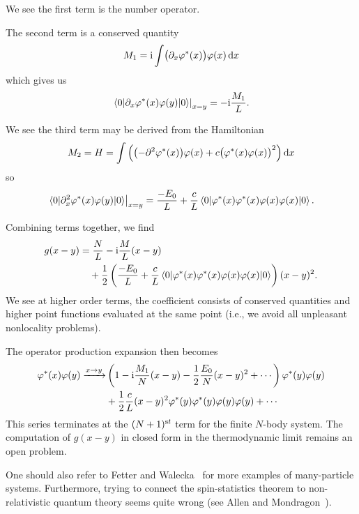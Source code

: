 We see the first term is the number operator. 

The second term is a conserved quantity
\begin{equation}
M_{1} = \mathrm{i}\int\bigl(\partial_{x}\varphi^{*}(x)\bigr)\varphi(x)\,\mathrm{d} x
\end{equation}
which gives us
\begin{equation}
\left.\braket{0|\partial_{x}\varphi^{*}(x)\varphi(y)|0}\right|_{x=y}
=-\mathrm{i}\frac{M_{1}}{L}.
\end{equation}

We see the third term may be derived from the Hamiltonian
\begin{equation}
M_{2} = H = \int\left(\bigl(-\partial^{2}\varphi^{*}(x)\bigr)\varphi(x)
+ c \bigl(\varphi^{*}(x)\varphi(x)\bigr)^{2}\right)\mathrm{d} x
\end{equation}
so
\begin{equation}
\left.\braket{0|\partial_{x}^{2}\varphi^{*}(x)\varphi(y)|0}\right|_{x=y}
=\frac{-E_{0}}{L}+\frac{c}{L}\braket{0|\varphi^{*}(x)\varphi^{*}(x)\varphi(x)\varphi(x)|0}.
\end{equation}

Combining terms together, we find
\begin{equation}
\begin{split}
g(x-y)&=\frac{N}{L}-\mathrm{i}\frac{M}{L}(x-y)\\
&\quad+\frac{1}{2}\left(\frac{-E_{0}}{L}+\frac{c}{L}\braket{0|\varphi^{*}(x)\varphi^{*}(x)\varphi(x)\varphi(x)|0}\right)(x-y)^{2}.
\end{split}
\end{equation}
We see at higher order terms, the coefficient consists of conserved
quantities and higher point functions evaluated at the same point (i.e.,
we avoid all unpleasant nonlocality problems).

The operator production expansion then becomes
\begin{equation}
\begin{split}
\varphi^{*}(x)\varphi(y)\xrightarrow{x\to y}&
\left(1 - \mathrm{i}\frac{M_{1}}{N}(x-y)-\frac{1}{2}\frac{E_{0}}{N}(x-y)^{2}+\cdots\right)\varphi^{*}(y)\varphi(y)\\
&+\frac{1}{2}\frac{c}{L}(x-y)^{2}\varphi^{*}(y)\varphi^{*}(y)\varphi(y)\varphi(y)+\cdots
\end{split}
\end{equation}
This series terminates at the $(N+1)^{\text st}$ term for the finite
$N$-body system. The computation of $g(x-y)$ in closed form in the
thermodynamic limit remains an open problem.

One should also refer to Fetter and Walecka~\cite[Ch.\ 1]{fetter} 
for more examples of many-particle systems. Furthermore, trying to 
connect the spin-statistics theorem to non-relativistic quantum 
theory seems quite wrong (see Allen and Mondragon~\cite{allen2003ss}).
